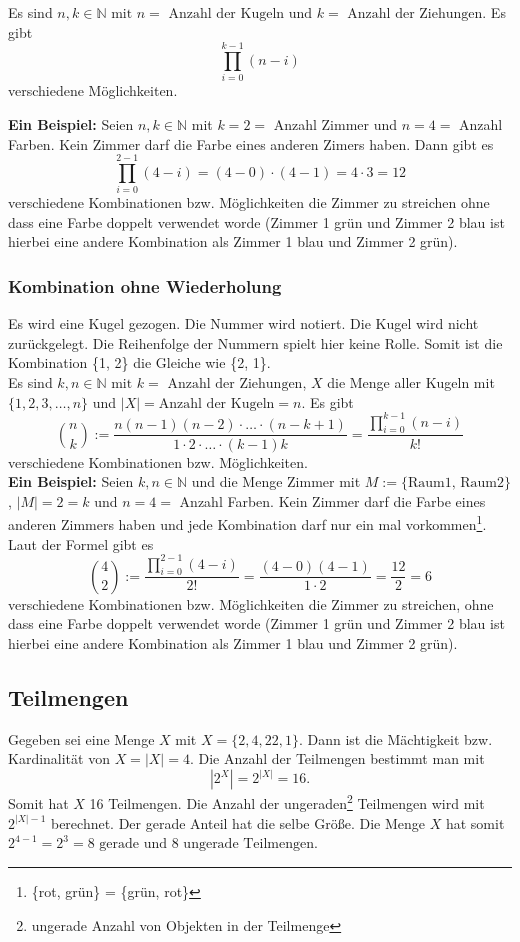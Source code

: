\documentclass[12pt, twoside]{article}
\newcommand{\N}{\mathbb{N}}
\begin{document}
Es sind $n, k \in \N \text{ mit } n= \text{ Anzahl der Kugeln und } k= \text{ Anzahl der Ziehungen}$. Es gibt 
$$
\prod_{i=0}^{k-1}(n-i)
$$
verschiedene Möglichkeiten.

\textbf{Ein Beispiel:} Seien $n, k \in \N$ mit $k=2=$ Anzahl Zimmer und $n=4=$ Anzahl Farben. Kein Zimmer darf
die Farbe eines anderen Zimers haben. Dann gibt es 
$$
\prod_{i=0}^{2-1}(4-i)=(4-0)\cdot (4-1)=4 \cdot 3 = 12
$$
verschiedene Kombinationen bzw. Möglichkeiten die Zimmer zu streichen ohne dass eine Farbe doppelt verwendet worde (Zimmer 1
grün und Zimmer 2 blau ist hierbei eine andere Kombination als Zimmer 1 blau und Zimmer 2 grün).

\subsubsection{Kombination ohne Wiederholung}
Es wird eine Kugel gezogen. Die Nummer wird notiert. Die Kugel wird nicht zurückgelegt. Die Reihenfolge der Nummern
spielt hier keine Rolle. Somit ist die Kombination \{1, 2\} die Gleiche wie \{2, 1\}. \\

Es sind $k, n \in \N \text{ mit }k= \text{ Anzahl der Ziehungen}$, $X$ die Menge aller Kugeln mit $\{1, 2, 3, \dots, n\}$ und $|X|= \text{Anzahl der Kugeln}=n$. Es gibt 
$$
\binom{n}{k}:= \frac{n(n-1)(n-2) \cdot \ldots \cdot (n-k+1)}{1 \cdot 2 \cdot \ldots \cdot (k-1)k} = \frac { \prod_{i=0}^{k-1}(n-i)}{k!}
$$
verschiedene Kombinationen bzw. Möglichkeiten. \\

\textbf{Ein Beispiel:} Seien $k, n \in \N$ und die Menge Zimmer mit $M:=\{ \text{Raum1, Raum2} \}$, $|M|=2=k$ und $n=4=$ Anzahl Farben. Kein Zimmer darf
die Farbe eines anderen Zimmers haben und jede Kombination darf nur ein mal vorkommen\footnote{ \{rot, grün\} = \{grün, rot\}}. Laut der Formel gibt es
$$
\binom{4}{2}:=\frac { \prod_{i=0}^{2-1}(4-i)}{2!} = \frac{(4-0)(4-1)}{1 \cdot 2}= \frac{12}{2}=6
$$
verschiedene Kombinationen bzw. Möglichkeiten die Zimmer zu streichen, ohne dass eine Farbe doppelt verwendet worde (Zimmer 1
grün und Zimmer 2 blau ist hierbei eine andere Kombination als Zimmer 1 blau und Zimmer 2 grün).






\subsection{Teilmengen}
Gegeben sei eine Menge $X$ mit $X=\{2, 4,22 ,1\}$. Dann ist die Mächtigkeit bzw. Kardinalität von $X=|X|=4$. Die Anzahl der Teilmengen bestimmt
man mit
$$
|2^X|=2^{|X|}=16.
$$
Somit hat $X$ 16 Teilmengen. Die Anzahl der ungeraden\footnote{ungerade Anzahl von Objekten in der Teilmenge} Teilmengen wird mit $2^{|X|-1}$ 
berechnet. Der gerade Anteil hat die selbe Größe. Die Menge $X$ hat somit $2^{4-1}=2^3=8 \text{ gerade und } 8 \text{ ungerade Teilmengen}$.
\end{document}
